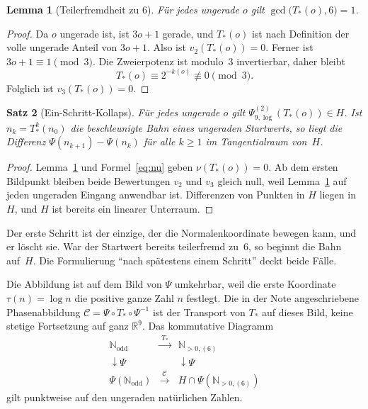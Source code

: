 \documentclass[11pt,a4paper]{article}
\theoremstyle{plain}
\newtheorem{theorem}{Satz}[section]
\newtheorem{lemma}[theorem]{Lemma}
\theoremstyle{definition}
\newcommand{\N}{\mathbb{N}}
\newcommand{\R}{\mathbb{R}}
\numberwithin{equation}{section}
\begin{document}
\begin{lemma}[Teilerfremdheit zu $6$]
\label{lem:gcd6}
Für jedes ungerade $o$ gilt $\gcd\bigl(T_*(o),6\bigr)=1$.
\end{lemma}

\begin{proof}
Da $o$ ungerade ist, ist $3o+1$ gerade, und $T_*(o)$ ist nach Definition der
volle ungerade Anteil von $3o+1$.
Also ist $v_2(T_*(o))=0$.
Ferner ist $3o+1\equiv 1\pmod{3}$.
Die Zweierpotenz ist modulo~$3$ invertierbar, daher bleibt
\begin{equation}
T_*(o)\equiv 2^{-k(o)}\not\equiv 0\pmod{3}.
\end{equation}
Folglich ist $v_3(T_*(o))=0$.
\end{proof}

\begin{theorem}[Ein-Schritt-Kollaps]
\label{thm:kollaps}
Für jedes ungerade $o$ gilt $\Psi_{9,\log}^{(2)}(T_*(o))\in H$.
Ist $n_k=T_*^k(n_0)$ die beschleunigte Bahn eines ungeraden Startwerts, so liegt
die Differenz $\Psi(n_{k+1})-\Psi(n_k)$ für alle $k\ge 1$ im Tangentialraum von~$H$.
\end{theorem}

\begin{proof}
Lemma~\ref{lem:gcd6} und Formel~\eqref{eq:nu} geben $\nu(T_*(o))=0$.
Ab dem ersten Bildpunkt bleiben beide Bewertungen $v_2$ und $v_3$ gleich null,
weil Lemma~\ref{lem:gcd6} auf jeden ungeraden Eingang anwendbar ist.
Differenzen von Punkten in $H$ liegen in $H$, und $H$ ist bereits ein
linearer Unterraum.
\end{proof}

Der erste Schritt ist der einzige, der die Normalenkoordinate bewegen kann,
und er löscht sie.
War der Startwert bereits teilerfremd zu~$6$, so beginnt die Bahn auf~$H$.
Die Formulierung "`nach spätestens einem Schritt"' deckt beide Fälle.

Die Abbildung ist auf dem Bild von $\Psi$ umkehrbar, weil die erste Koordinate
$\tau(n)=\log n$ die positive ganze Zahl $n$ festlegt.
Die in der Note angeschriebene Phasenabbildung
$\mathcal{C}=\Psi\circ T_*\circ\Psi^{-1}$ ist der Transport von $T_*$ auf dieses
Bild, keine stetige Fortsetzung auf ganz $\R^9$.
Das kommutative Diagramm
\begin{equation}
\begin{array}{ccc}
\N_{\mathrm{odd}} & \xrightarrow{\;T_*\;} & \N_{>0,(6)} \\[0.8em]
\downarrow\Psi && \downarrow\Psi \\[0.6em]
\Psi(\N_{\mathrm{odd}}) & \xrightarrow{\;\mathcal{C}\;} &
H\cap\Psi(\N_{>0,(6)})
\end{array}
\end{equation}
gilt punktweise auf den ungeraden natürlichen Zahlen.
\end{document}
